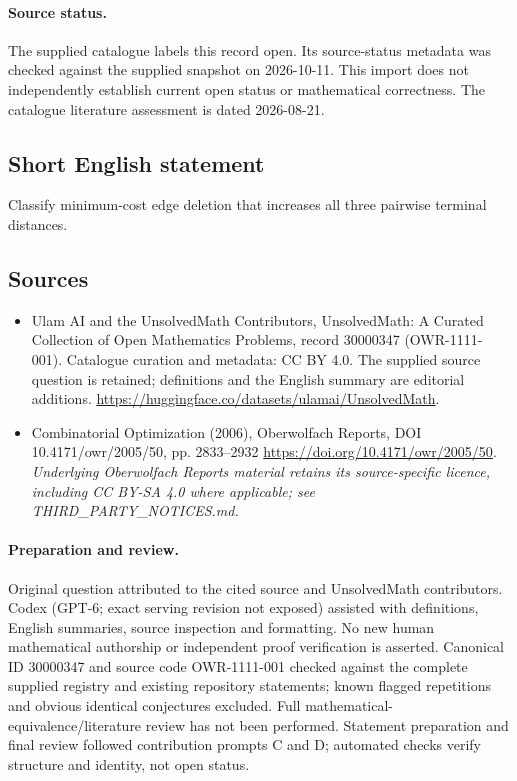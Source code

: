 \documentclass[11pt]{article}
\begin{document}
\paragraph{Source status.}
The supplied catalogue labels this record open. Its source-status metadata was checked against the supplied snapshot on 2026-10-11. This import does not independently establish current open status or mathematical correctness. The catalogue literature assessment is dated 2026-08-21.
\subsection{Short English statement}
Classify minimum-cost edge deletion that increases all three pairwise terminal distances.
\subsection{Sources}
\begin{itemize}
\item[S1] Ulam AI and the UnsolvedMath Contributors, UnsolvedMath: A Curated Collection of Open Mathematics Problems, record 30000347 (OWR-1111-001). Catalogue curation and metadata: CC BY 4.0. The supplied source question is retained; definitions and the English summary are editorial additions.
\url{https://huggingface.co/datasets/ulamai/UnsolvedMath}.
\item[S2] Combinatorial Optimization (2006), Oberwolfach Reports, DOI 10.4171/owr/2005/50, pp. 2833--2932
\url{https://doi.org/10.4171/owr/2005/50}.
\textit{Underlying Oberwolfach Reports material retains its source-specific licence, including CC BY-SA 4.0 where applicable; see THIRD\_PARTY\_NOTICES.md.}
\end{itemize}
\paragraph{Preparation and review.}
Original question attributed to the cited source and UnsolvedMath contributors. Codex (GPT-6; exact serving revision not exposed) assisted with definitions, English summaries, source inspection and formatting. No new human mathematical authorship or independent proof verification is asserted. Canonical ID 30000347 and source code OWR-1111-001 checked against the complete supplied registry and existing repository statements; known flagged repetitions and obvious identical conjectures excluded. Full mathematical-equivalence/literature review has not been performed. Statement preparation and final review followed contribution prompts C and D; automated checks verify structure and identity, not open status.
\label{end:30000347}
\end{document}

